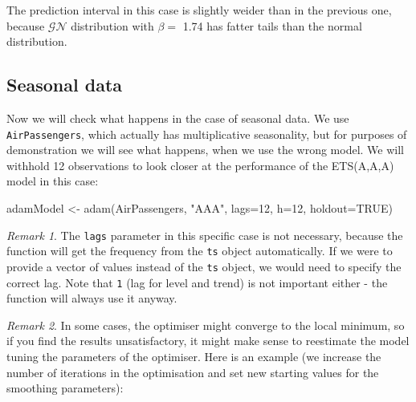 \documentclass[
]{book}
\newenvironment{Shaded}{\begin{snugshade}}{\end{snugshade}}
\newcommand{\AttributeTok}[1]{\textcolor[rgb]{0.77,0.63,0.00}{#1}}
\newcommand{\ConstantTok}[1]{\textcolor[rgb]{0.00,0.00,0.00}{#1}}
\newcommand{\DecValTok}[1]{\textcolor[rgb]{0.00,0.00,0.81}{#1}}
\newcommand{\FunctionTok}[1]{\textcolor[rgb]{0.00,0.00,0.00}{#1}}
\newcommand{\NormalTok}[1]{#1}
\newcommand{\OtherTok}[1]{\textcolor[rgb]{0.56,0.35,0.01}{#1}}
\newcommand{\StringTok}[1]{\textcolor[rgb]{0.31,0.60,0.02}{#1}}
\theoremstyle{definition}
\theoremstyle{definition}
\theoremstyle{definition}
\theoremstyle{definition}
\theoremstyle{remark}
\newtheorem*{remark}{Remark}
\begin{document}
The prediction interval in this case is slightly weider than in the previous one, because \(\mathcal{GN}\) distribution with \(\beta=\) 1.74 has fatter tails than the normal distribution.

\hypertarget{ADAMETSPureAdditiveExamplesETSAAA}{%
\subsection{Seasonal data}\label{ADAMETSPureAdditiveExamplesETSAAA}}

Now we will check what happens in the case of seasonal data. We use \texttt{AirPassengers}, which actually has multiplicative seasonality, but for purposes of demonstration we will see what happens, when we use the wrong model. We will withhold 12 observations to look closer at the performance of the ETS(A,A,A) model in this case:

\begin{Shaded}
\begin{Highlighting}[]
\NormalTok{adamModel }\OtherTok{\textless{}{-}} \FunctionTok{adam}\NormalTok{(AirPassengers, }\StringTok{"AAA"}\NormalTok{, }\AttributeTok{lags=}\DecValTok{12}\NormalTok{, }\AttributeTok{h=}\DecValTok{12}\NormalTok{, }\AttributeTok{holdout=}\ConstantTok{TRUE}\NormalTok{)}
\end{Highlighting}
\end{Shaded}

\begin{remark}
The \texttt{lags} parameter in this specific case is not necessary, because the function will get the frequency from the \texttt{ts} object automatically. If we were to provide a vector of values instead of the \texttt{ts} object, we would need to specify the correct lag. Note that \texttt{1} (lag for level and trend) is not important either - the function will always use it anyway.
\end{remark}

\begin{remark}
In some cases, the optimiser might converge to the local minimum, so if you find the results unsatisfactory, it might make sense to reestimate the model tuning the parameters of the optimiser. Here is an example (we increase the number of iterations in the optimisation and set new starting values for the smoothing parameters):
\end{remark}
\end{document}
